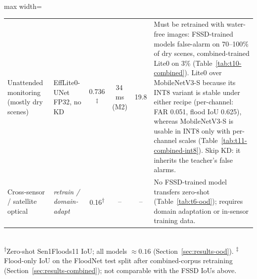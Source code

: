 \begin{table}[ht]
\begin{adjustbox}{max width=\textwidth}
\begin{tabular}{p{2.9cm}lcccp{6.2cm}}
\addlinespace
Unattended monitoring (mostly dry scenes)
  & EffLite0-UNet FP32, no KD & 0.736\textsuperscript{$\ddagger$} & 34\,ms (M2) & 19.8
  & Must be retrained with water-free images: FSSD-trained models false-alarm on 70--100\% of dry scenes, combined-trained Lite0 on 3\% (Table~\ref{tab:t10-combined}). Lite0 over MobileNetV3-S because its INT8 variant is stable under either recipe (per-channel: FAR 0.051, flood IoU 0.625), whereas MobileNetV3-S is usable in INT8 only with per-channel scales (Table~\ref{tab:t11-combined-int8}). Skip KD: it inherits the teacher's false alarms. \\
\addlinespace
Cross-sensor / satellite optical
  & \emph{retrain / domain-adapt} & 0.16\textsuperscript{$\dagger$} & -- & --
  & No FSSD-trained model transfers zero-shot (Table~\ref{tab:t6-ood}); requires domain adaptation or in-sensor training data. \\
\bottomrule
\end{tabular}
\end{adjustbox}
\\[3pt]
{\footnotesize \textsuperscript{$\dagger$}Zero-shot Sen1Floods11 IoU; all models $\approx 0.16$ (Section~\ref{sec:results-ood}). \textsuperscript{$\ddagger$}Flood-only IoU on the FloodNet test split after combined-corpus retraining (Section~\ref{sec:results-combined}); not comparable with the FSSD IoUs above.}
\end{table}
